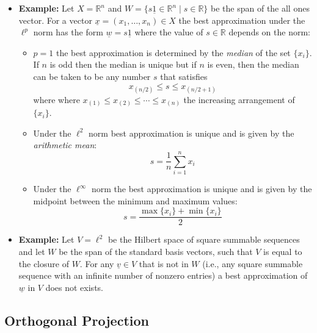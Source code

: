 \documentclass[11pt,twoside]{report}
\newcommand{\bbR}{{\mathbb{R}}}
\newcommand{\vecnot}{\underline}
\begin{document}
\begin{itemize}
\item \textbf{Example:} %
Let $X = \bbR^n$ and  $W  = \{s \vecnot{1} \in \bbR^n \mid  s \in \bbR\}$ be the span of the all ones vector. For a vector  $\vecnot{x}  =(x_1, \dots ,x_n) \in X$ the best approximation  under the $\ell^p$ norm has the form $\vecnot{w}  = s \vecnot{1}$ where the value of $s \in \bbR$  depends on the norm: 
\begin{itemize}
\item  $p =1$  the best approximation is determined by the \emph{median} of the set $\{ x_i \}$. If $n$ is odd then the median is unique but if $n$ is even, then the median can be taken to be any number $s$ that satisfies 
\[
x_{(n/2)} \le s \le x_{(n/2+1)}
\]
where where $x_{(1)} \le x_{(2)} \le \cdots \le x_{(n)}$ the increasing arrangement of $\{ x_i\}$. 
\item Under the $\ell^2$ norm  best approximation is unique and is given by the \emph{arithmetic mean}: 
\[
s = \frac{1}{n} \sum_{i=1}^n x_i 
\]
\item Under the $\ell^\infty$ norm  the best approximation is unique and is given by the midpoint between the minimum and maximum values: 
\[
s =\frac{ \max \{ x_i\} +\min \{ x_i\}}{2} 
\]
\end{itemize}


\item \textbf{Example:} Let $V = \ell^2$ be the Hilbert space of square summable sequences and let $W$ be the span of the standard basis vectors, such that $V$ is equal to the closure of $W$. 
For any  $\vecnot{v}  \in V$ that is not in $W$ (i.e., any square summable sequence with an infinite number of nonzero entries) a best approximation of $\vecnot{w}$ in $V$ does not exists. 


\end{itemize}

\subsection{Orthogonal Projection}
\end{document}

